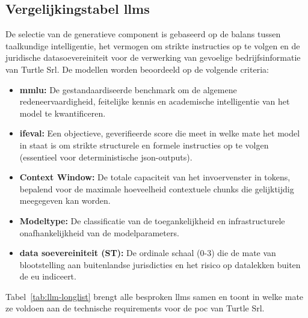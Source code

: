 \subsection{Vergelijkingstabel \glspl{llm}}

De selectie van de generatieve component is gebaseerd op de balans tussen taalkundige intelligentie, het vermogen om strikte instructies op te volgen en de juridische datasoevereiniteit voor de verwerking van gevoelige bedrijfsinformatie van Turtle Srl. De modellen worden beoordeeld op de volgende criteria:

\begin{itemize}
  \item \textbf{\gls{mmlu}:} De gestandaardiseerde benchmark om de algemene redeneervaardigheid, feitelijke kennis en academische intelligentie van het model te kwantificeren.
  \item \textbf{\gls{ifeval}:} Een objectieve, geverifieerde score die meet in welke mate het model in staat is om strikte structurele en formele instructies op te volgen (essentieel voor deterministische \gls{json}-outputs).
  \item \textbf{Context Window:} De totale capaciteit van het invoervenster in tokens, bepalend voor de maximale hoeveelheid contextuele chunks die gelijktijdig meegegeven kan worden.
  \item \textbf{Modeltype:} De classificatie van de toegankelijkheid en infrastructurele onafhankelijkheid van de modelparameters.
  \item \textbf{data soevereiniteit (ST):} De ordinale schaal (0-3) die de mate van blootstelling aan buitenlandse jurisdicties en het risico op datalekken buiten de \gls{eu} indiceert.
\end{itemize}

Tabel~\ref{tab:llm-longlist} brengt alle besproken \glspl{llm} samen en toont in welke mate ze voldoen aan de technische requirements voor de \gls{poc} van Turtle Srl.

